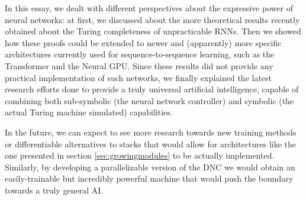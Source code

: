 \documentclass{article}
\begin{document}
In this essay, we dealt with different perspectives about the expressive power of neural networks: at first, we discussed about the more theoretical results recently obtained about the Turing completeness of unpracticable RNNs. Then we showed how these proofs could be extended to newer and (apparently) more specific architectures currently used for sequence-to-sequence learning, such as the Transformer and the Neural GPU. Since these results did not provide any practical implementation of such networks, we finally explained the latest research efforts done to provide a truly universal artificial intelligence, capable of combining both sub-symbolic (the neural network controller) and symbolic (the actual Turing machine simulated) capabilities.

In the future, we can expect to see more research towards new training methods or differentiable alternatives to stacks that would allow for architectures like the one presented in section \ref{sec:growingmodules} to be actually implemented. Similarly, by developing a parallelizable version of the DNC we would obtain an easily-trainable but incredibly powerful machine that would push the boundary towards a truly general AI.

\clearpage
\end{document}
